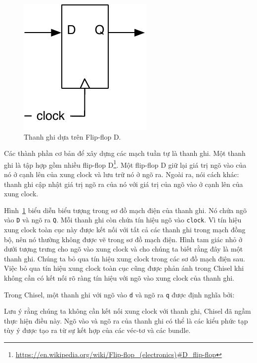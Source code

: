 \documentclass[%
    10pt,
    headinclude, footexclude,
    openright, %
    notitlepage,
    cleardoubleempty,
    headsepline,
    pointlessnumbers,
    bibtotoc, idxtotoc,
    ]{scrbook}
\newcommand{\code}[1]{{\small{\texttt{#1}}}}
\newcommand{\scale}{0.7}
\newcommand{\myref}[2]{\href{#1}{#2}}
\renewcommand{\myref}[2]{{#2}{\footnote{\url{#1}}}}
\begin{document}

\begin{figure}
  \centering
  \includegraphics[scale=\scale]{figures/register}
  \caption{Thanh ghi dựa trên Flip-flop D.}
  \label{fig:register}
\end{figure}

Các thành phần cơ bản để xây dựng các mạch tuần tự là thanh ghi. Một thanh ghi là tập hợp gồm 
nhiều \myref{https://en.wikipedia.org/wiki/Flip-flop_(electronics)\#D_flip-flop}{flip-flop D}.
Một flip-flop D giữ lại giá trị ngõ vào của nó ở cạnh lên của xung clock và lưu trữ nó ở ngõ ra. 
Ngoài ra, nói cách khác: thanh ghi cập nhật giá trị ngõ ra của nó với giá trị của ngõ vào ở cạnh lên của xung clock.

Hình~\ref{fig:register} biểu diễn biểu tượng trong sơ đồ mạch điện của thanh ghi. Nó chứa ngõ vào
\code{D} và ngõ ra \code{Q}. Mỗi thanh ghi còn chứa tín hiệu ngõ vào \code{clock}.
Vì tín hiệu xung clock toàn cục này được kết nối với tất cả các thanh ghi trong mạch đồng bộ, nên nó thường 
không được vẽ trong sơ đồ mạch điện. Hình tam giác nhỏ ở dưới tượng trưng cho ngõ vào xung clock và 
cho chúng ta biết rằng đây là một thanh ghi. Chúng ta bỏ qua tín hiệu xung clock trong các sơ đồ mạch điện sau.
Việc bỏ qua tín hiệu xung clock toàn cục cũng được phản ánh trong Chisel khi không cần có kết nối rõ ràng tín hiệu với 
ngõ vào xung clock của thanh ghi.

Trong Chisel, một thanh ghi với ngõ vào \code{d} và ngõ ra \code{q} được định nghĩa bởi:


\noindent Lưu ý rằng chúng ta không cần kết nối xung clock với thanh ghi, Chisel đã 
ngầm thực hiện điều này. Ngõ vào và ngõ ra của thanh ghi có thể là các kiểu phức tạp 
tùy ý được tạo ra từ sự kết hợp của các véc-tơ và các bundle.
\end{document}

